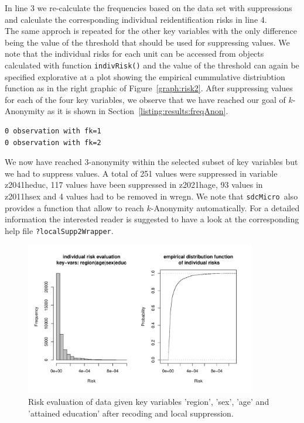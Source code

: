 \documentclass[12pt]{article}
\newcommand{\sdcMicro}{\texttt{sdcMicro}}
\begin{document}
In line 3 we re-calculate the frequencies based on the data set with suppressions and 
calculate the corresponding individual reidentification risks in line 4. \\

The same approch is repeated for the other key variables with the only difference 
being the value of the threshold that should be used for suppressing values. 
We note that the individual risks for each unit can be accessed from objects calculated
 with function \lstinline{indivRisk()} and the value of the threshold can again be specified explorative at a plot showing
 the empirical cummulative distriubtion function as in the right graphic of Figure~\ref{graph:risk2}. 
 After suppressing values for each of the four 
 key variables, we observe that we have reached our 
goal of $k$-Anonymity as it is shown in Section~\ref{listing:results:freqAnon}.
\begin{lstlisting}[numbers=none,captionpos=b, caption={Results of frequency calculation after local suppression}, label=listing:results:freqAnon]
0 observation with fk=1 
0 observation with fk=2 
\end{lstlisting}
We now have reached 3-anonymity within the selected subset of key variables but
we had to suppress values. A total of 251 values were suppressed in variable
z2041\textunderscore h\textunderscore educ, 117 values have been suppressed in z2021\textunderscore h\textunderscore age, 93 values in z2011\textunderscore h\textunderscore sex and 4 values had to be removed in w\textunderscore regn. We note that \sdcMicro~also provides a function that allow to reach $k$-Anonymity automatically. For a detailed information the interested reader is suggested to have a look at the corresponding help file \lstinline{?localSupp2Wrapper}.


\begin{figure}
	\centering
	\includegraphics[width=0.9\textwidth]{risk3}
	\caption{Risk evaluation of data given key variables 'region', 'sex', 'age' and 'attained education' after recoding and local suppression.}
	\label{graph:risk3}
\end{figure}
\end{document}
